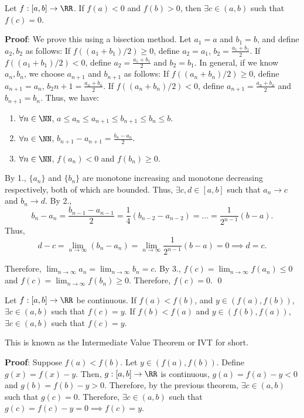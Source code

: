 \begin{theorem}
Let $f:[a,b]\to \RR$. If $f(a) < 0$ and $f(b)>0$, then $\exists c\in (a,b)$ such that $f(c) = 0$.
\end{theorem}
\textbf{Proof}: We prove this using a bisection method. Let $a_1 = a$ and $b_1 = b$, and define $a_2,b_2$ as follows: If $f((a_1+b_1)/2)\geq 0$, define $a_2 = a_1$, $b_2 = \frac{a_1+b_1}{2}$. If $f((a_1+b_1)/2) < 0$, define $a_2 = \frac{a_1+b_1}{2}$ and $b_2 =b_1$. In general, if we know $a_n,b_n$, we choose $a_{n+1}$ and $b_{n+1}$ as follows: If $f((a_n+b_n)/2)\geq 0$, define $a_{n+1} = a_n$, $b_2{n+1} = \frac{a_n+b_n}{2}$. If $f((a_n+b_n)/2) < 0$, define $a_{n+1} = \frac{a_n+b_n}{2}$ and $b_{n+1} =b_n$. Thus, we have:
\begin{enumerate}
    \item $\forall n\in \NN$, $a\leq a_n \leq a_{n+1}\leq b_{n+1}\leq b_n \leq b$.
    \item $\forall n\in \NN$, $b_{n+1}-a_{n+1} = \frac{b_{n}-a_n}{2}$.
    \item $\forall n\in \NN$, $f(a_n) < 0$ and $f(b_n) \geq 0$.
\end{enumerate}
By 1., $\{a_n\}$ and $\{b_n\}$ are monotone increasing and monotone decreasing respectively, both of which are bounded. Thus, $\exists c,d\in [a,b]$ such that $a_n\to c$ and $b_n\to d$. By 2., 
\[
b_n-a_n = \frac{b_{n-1}-a_{n-1}}{2} = \frac{1}{4}(b_{n-2}-a_{n-2}) = \dots = \frac{1}{2^{n-1}}(b-a).
\]
Thus, \[d-c = \lim_{n\to \infty} (b_n-a_n) = \lim_{n\to \infty} \frac{1}{2^{n-1}} (b-a)=0\implies d=c.\]

Therefore, $\lim_{n\to \infty} a_n = \lim_{n\to \infty} b_n = c$. By 3., $f(c) = \lim_{n\to \infty} f(a_n) \leq 0$ and $f(c) = \lim_{n\to \infty} f(b_n) \geq 0$. Therefore, $f(c) = 0.$ \qed 

\begin{theorem}
Let $f:[a,b] \to \RR$ be continuous. If $f(a) < f(b)$, and $y\in (f(a),f(b))$, $\exists c\in (a,b)$ such that $f(c) = y.$ If $f(b) < f(a)$ and $y\in (f(b),f(a))$, $\exists c\in (a,b)$ such that $f(c) = y.$
\end{theorem}
\begin{remark}
This is known as the Intermediate Value Theorem or IVT for short.
\end{remark}

\textbf{Proof}: Suppose $f(a) < f(b)$. Let $y\in (f(a),f(b))$. Define $g(x) = f(x)-y$. Then, $g:[a,b]\to \RR$ is continuous, $g(a) = f(a)-y<0$ and $g(b) = f(b)-y>0$. Therefore, by the previous theorem, $\exists c\in (a,b)$ such that $g(c) = 0$. Therefore, $\exists c\in (a,b)$ such that $g(c) = f(c) -y = 0 \implies f(c) = y$.

